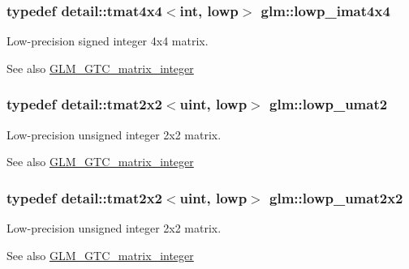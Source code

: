 \subsubsection[{\texorpdfstring{lowp\+\_\+imat4x4}{lowp_imat4x4}}]{\setlength{\rightskip}{0pt plus 5cm}typedef detail\+::tmat4x4$<$int, lowp$>$ {\bf glm\+::lowp\+\_\+imat4x4}}\hypertarget{group__gtc__matrix__integer_ga92339a0b053a721e3b88267e6d175014}{}\label{group__gtc__matrix__integer_ga92339a0b053a721e3b88267e6d175014}
Low-\/precision signed integer 4x4 matrix. \begin{DoxySeeAlso}{See also}
\hyperlink{group__gtc__matrix__integer}{G\+L\+M\+\_\+\+G\+T\+C\+\_\+matrix\+\_\+integer} 
\end{DoxySeeAlso}
\subsubsection[{\texorpdfstring{lowp\+\_\+umat2}{lowp_umat2}}]{\setlength{\rightskip}{0pt plus 5cm}typedef detail\+::tmat2x2$<$uint, lowp$>$ {\bf glm\+::lowp\+\_\+umat2}}\hypertarget{group__gtc__matrix__integer_ga09df85e6b5e53f66a86d042e0633bfbc}{}\label{group__gtc__matrix__integer_ga09df85e6b5e53f66a86d042e0633bfbc}
Low-\/precision unsigned integer 2x2 matrix. \begin{DoxySeeAlso}{See also}
\hyperlink{group__gtc__matrix__integer}{G\+L\+M\+\_\+\+G\+T\+C\+\_\+matrix\+\_\+integer} 
\end{DoxySeeAlso}
\subsubsection[{\texorpdfstring{lowp\+\_\+umat2x2}{lowp_umat2x2}}]{\setlength{\rightskip}{0pt plus 5cm}typedef detail\+::tmat2x2$<$uint, lowp$>$ {\bf glm\+::lowp\+\_\+umat2x2}}\hypertarget{group__gtc__matrix__integer_gaa4dfe67706187e459004b9a6c500b048}{}\label{group__gtc__matrix__integer_gaa4dfe67706187e459004b9a6c500b048}
Low-\/precision unsigned integer 2x2 matrix. \begin{DoxySeeAlso}{See also}
\hyperlink{group__gtc__matrix__integer}{G\+L\+M\+\_\+\+G\+T\+C\+\_\+matrix\+\_\+integer} 
\end{DoxySeeAlso}
